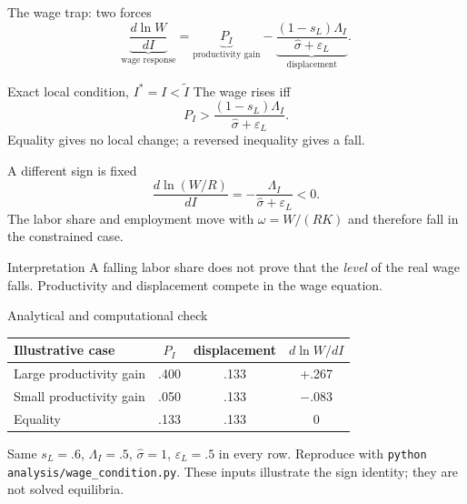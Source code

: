 \documentclass[aspectratio=169,11pt]{beamer}
\begin{document}
\begin{frame}{The wage trap: two forces}
\[\underbrace{\frac{d\ln W}{dI}}_{\text{wage response}}
=\underbrace{P_I}_{\text{productivity gain}}
-\underbrace{\frac{(1-s_L)\Lambda_I}{\widehat\sigma+\varepsilon_L}}_{\text{displacement}}.\]
\begin{block}{Exact local condition, $I^*=I<\widetilde I$}
The wage rises iff
\[P_I>\frac{(1-s_L)\Lambda_I}{\widehat\sigma+\varepsilon_L}.\]
Equality gives no local change; a reversed inequality gives a fall.
\end{block}
\end{frame}

\begin{frame}{A different sign is fixed}
\[\frac{d\ln(W/R)}{dI}=-\frac{\Lambda_I}{\widehat\sigma+\varepsilon_L}<0.\]
The labor share and employment move with $\omega=W/(RK)$ and therefore fall in the constrained case.
\vspace{.8em}
\begin{alertblock}{Interpretation}
A falling labor share does not prove that the \emph{level} of the real wage falls. Productivity and displacement compete in the wage equation.
\end{alertblock}
\end{frame}

\begin{frame}{Analytical and computational check}
\begin{center}
\begin{tabular}{lccc}
\toprule
Illustrative case & $P_I$ & displacement & $d\ln W/dI$ \\
\midrule
Large productivity gain & .400 & .133 & +.267 \\
Small productivity gain & .050 & .133 & $-.083$ \\
Equality & .133 & .133 & $0$ \\
\bottomrule
\end{tabular}
\end{center}
\vspace{.4em}
Same $s_L=.6$, $\Lambda_I=.5$, $\widehat\sigma=1$, $\varepsilon_L=.5$ in every row. Reproduce with \texttt{python analysis/wage\_condition.py}. These inputs illustrate the sign identity; they are not solved equilibria.
\end{frame}
\end{document}
